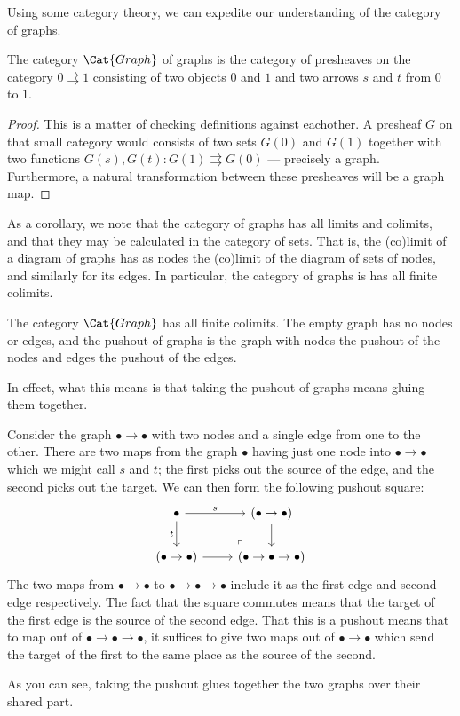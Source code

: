 \documentclass[DynamicalBook]{subfiles}
\begin{document}
Using some category theory, we can expedite our understanding of the category of graphs.
\begin{proposition}
 The category $\Cat{Graph}$ of graphs is the category of presheaves on the category $0 \rightrightarrows 1$ consisting of two objects $0$ and $1$ and two arrows $s$ and $t$ from $0$ to $1$.
\end{proposition}
\begin{proof}
This is a matter of checking definitions against eachother. A presheaf $G$ on that small category would consists of two sets $G(0)$ and $G(1)$ together with two functions $G(s), G(t) : G(1) \rightrightarrows G(0)$ --- precisely a graph. Furthermore, a natural transformation between these presheaves will be a graph map.
\end{proof}

As a corollary, we note that the category of graphs has all limits and colimits, and that they may be calculated in the category of sets. That is, the (co)limit of a diagram of graphs has as nodes the (co)limit of the diagram of sets of nodes, and similarly for its edges. In particular, the category of graphs is has all finite colimits.
\begin{corollary}
The category $\Cat{Graph}$ has all finite colimits. The empty graph has no nodes or edges, and the pushout of graphs is the graph with nodes the pushout of the nodes and edges the pushout of the edges.
  \end{corollary}

  In effect, what this means is that taking the pushout of graphs means gluing them together.
  \begin{example}
    Consider the graph $\bullet \to \bullet$ with two nodes and a single edge from one to the other. There are two maps from the graph $\bullet$ having just one node into $\bullet \to \bullet$ which we might call $s$ and $t$; the first picks out the source of the edge, and the second picks out the target. We can then form the following pushout square:
    \[
\begin{tikzcd}
	\bullet & {(\bullet \to \bullet)} \\
	{(\bullet \to \bullet)} & {(\bullet \to \bullet \to \bullet)}
	\arrow["t"', from=1-1, to=2-1]
	\arrow["s", from=1-1, to=1-2]
	\arrow[from=1-2, to=2-2]
	\arrow[from=2-1, to=2-2]
	\arrow["\lrcorner"{anchor=center, pos=0.125, rotate=180}, draw=none, from=2-2, to=1-1]
\end{tikzcd}
    \]
    The two maps from $\bullet \to \bullet$ to $\bullet \to \bullet \to \bullet$ include it as the first edge and second edge respectively. The fact that the square commutes means that the target of the first edge is the source of the second edge. That this is a pushout means that to map out of $\bullet \to \bullet \to \bullet$, it suffices to give two maps out of $\bullet \to \bullet$ which send the target of the first to the same place as the source of the second.

    As you can see, taking the pushout glues together the two graphs over their shared part.
  \end{example}
\end{document}
